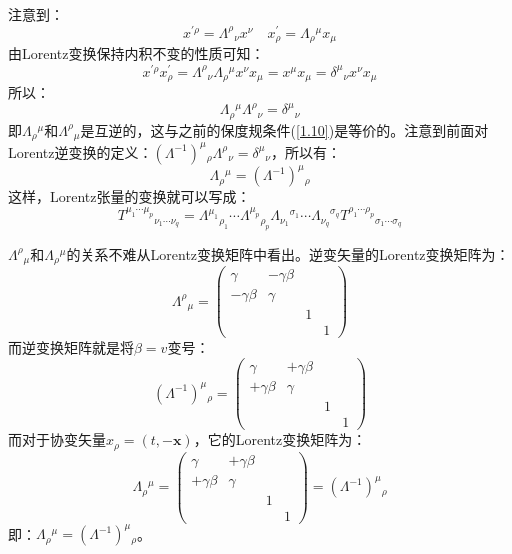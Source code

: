 \documentclass{book}
\begin{document}
注意到：
\begin{equation}
	x^{\prime\rho}=\Lambda^\rho{}_\nu x^\nu\quad x^\prime_\rho=\Lambda_\rho{}^\mu x_\mu
\end{equation}
由Lorentz变换保持内积不变的性质可知：
\begin{equation}
	x^{\prime\rho}x^\prime_\rho=\Lambda^\rho{}_\nu\Lambda_\rho{}^\mu x^\nu x_\mu=x^\mu x_\mu=\delta^\mu{}_\nu x^\nu x_\mu
\end{equation}
所以：
\begin{equation}
	\Lambda_\rho{}^\mu\Lambda^\rho{}_\nu=\delta^\mu{} _\nu
\end{equation}
即$\Lambda_\rho{}^\mu$和$\Lambda^\rho{}_\mu$是互逆的，这与之前的保度规条件(\ref{1.10})是等价的。注意到前面对Lorentz逆变换的定义：$(\Lambda^{-1})^\mu{}_\rho\Lambda^\rho{}_\nu=\delta^\mu{}_\nu$，所以有：
\begin{equation}
	\Lambda_\rho{}^\mu=(\Lambda^{-1})^\mu{}_\rho
\end{equation}
这样，Lorentz张量的变换就可以写成：
\begin{equation}
	T^{\mu_1\cdots\mu_p}{}_{\nu_1\cdots\nu_q}=\Lambda^{\mu_1}{}_{\rho_1}\cdots\Lambda^{\mu_p}{}_{\rho_p}\Lambda_{\nu_1}{}^{\sigma_1}\cdots\Lambda_{\nu_q}{}^{\sigma_q}T^{\rho_1\cdots\rho_p}{}_{\sigma_1\cdots\sigma_q}
\end{equation}

$\Lambda^\rho{}_\mu$和$\Lambda_\rho{}^\mu$的关系不难从Lorentz变换矩阵中看出。逆变矢量的Lorentz变换矩阵为：
\begin{equation}
	\Lambda^\rho{}_\mu=\begin{pmatrix}\gamma&-\gamma\beta\\-\gamma\beta&\gamma\\&&1\\&&&1\end{pmatrix}
\end{equation}
而逆变换矩阵就是将$\beta=v$变号：
\begin{equation}
	(\Lambda^{-1})^\mu{}_\rho=\begin{pmatrix}\gamma&+\gamma\beta\\+\gamma\beta&\gamma\\&&1\\&&&1\end{pmatrix}
\end{equation}
而对于协变矢量$x_\rho=(t,-\mathbf{x})$，它的Lorentz变换矩阵为：
\begin{equation}
	\Lambda_\rho{}^\mu=\begin{pmatrix}\gamma&+\gamma\beta\\+\gamma\beta&\gamma\\&&1\\&&&1\end{pmatrix}=(\Lambda^{-1})^\mu{}_\rho
\end{equation}
即：$\Lambda_\rho{}^\mu=(\Lambda^{-1})^\mu{}_\rho$。
\end{document}
